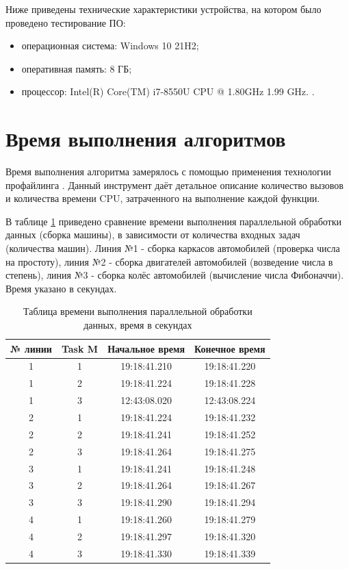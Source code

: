 \documentclass[12pt]{report}
\begin{document}
Ниже приведены технические характеристики устройства, на котором было проведено тестирование ПО:

\begin{itemize}
	\item операционная система: Windows 10 21H2;
	\item оперативная память: 8 ГБ;
	\item процессор: Intel(R) Core(TM) i7-8550U CPU @ 1.80GHz   1.99 GHz.
\cite{i5}.

\end{itemize}

\section{Время выполнения алгоритмов}

Время выполнения алгоритма замерялось с помощью применения технологии профайлинга \cite{profiling}. Данный инструмент даёт детальное описание количество вызовов и количества времени CPU, затраченного на выполнение каждой функции.

В таблице \ref{tab01} приведено сравнение времени выполнения параллельной обработки данных (сборка машины), в зависимости от количества входных задач (количества машин). Линия №1 - сборка каркасов автомобилей (проверка числа на простоту), линия №2 - сборка двигателей автомобилей (возведение числа в степень), линия №3 - сборка колёс автомобилей (вычисление числа Фибоначчи). Время указано в секундах.

\begin{table} [h!]
	\caption{Таблица времени выполнения параллельной обработки данных, время в секундах}
	\label{tab01}
	\begin{center}
		\begin{tabular}{|c c c c|} 
		 	\hline
			№ линии & Task M & Начальное время & Конечное время\\
		 	\hline
		 	1 & 1 & 19:18:41.210 & 19:18:41.220\\
		 	\hline
		 	1 & 2 & 19:18:41.224 & 19:18:41.228\\
		 	\hline
		 	1 & 3 & 12:43:08.020 & 12:43:08.224\\
		 	\hline
			2 & 1 & 19:18:41.224 & 19:18:41.232\\
			\hline
			2 & 2 & 19:18:41.241 & 19:18:41.252\\
			\hline
			2 & 3 & 19:18:41.264 & 19:18:41.275\\
			\hline
			3 & 1 & 19:18:41.241 & 19:18:41.248\\
			\hline
			3 & 2 & 19:18:41.264 & 19:18:41.267\\
			\hline
			3 & 3 & 19:18:41.290 & 19:18:41.294\\
			\hline
			4 & 1 & 19:18:41.260 & 19:18:41.279\\
			\hline
			4 & 2 & 19:18:41.297 & 19:18:41.320\\
			\hline
			4 & 3 & 19:18:41.330 & 19:18:41.339\\
			\hline
		\end{tabular}
	\end{center}
\end{table}
\end{document}
